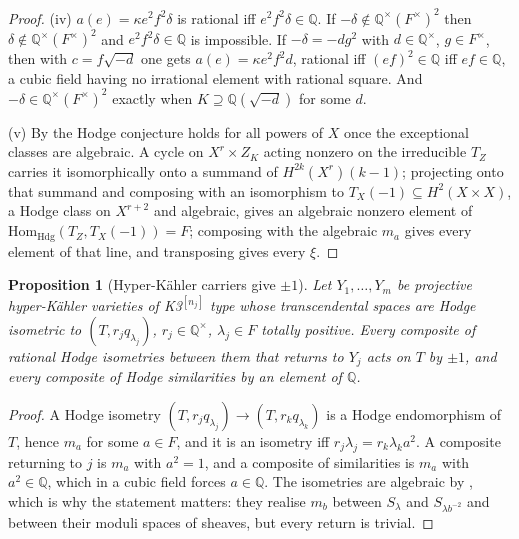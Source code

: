 \documentclass[11pt,reqno]{amsart}
\numberwithin{equation}{section}
\theoremstyle{plain}
\newtheorem{proposition}[theorem]{Proposition}
\theoremstyle{definition}
\newcommand{\QQ}{\mathbb{Q}}
\newcommand{\Hdg}{\mathrm{Hdg}}
\newcommand{\Hom}{\mathrm{Hom}}
\begin{document}
\begin{proof}
(iv) $a(e)=\kappa e^{2}f^{2}\delta$ is rational iff $e^{2}f^{2}\delta\in\QQ$. If $-\delta\notin\QQ^{\times}(F^{\times})^{2}$ then $\delta\notin\QQ^{\times}(F^{\times})^{2}$ and $e^{2}f^{2}\delta\in\QQ$ is impossible. If $-\delta=-dg^{2}$ with $d\in\QQ^{\times}$, $g\in F^{\times}$, then with $c=f\sqrt{-d}$ one gets $a(e)=\kappa e^{2}f^{2}d$, rational iff $(ef)^{2}\in\QQ$ iff $ef\in\QQ$, a cubic field having no irrational element with rational square. And $-\delta\in\QQ^{\times}(F^{\times})^{2}$ exactly when $K\supseteq\QQ(\sqrt{-d})$ for some $d$.

(v) By \cite[Thm.~21.7]{BMB26} the Hodge conjecture holds for all powers of $X$ once the exceptional classes are algebraic. A cycle on $X^{r}\times Z_{K}$ acting nonzero on the irreducible $T_{Z}$ carries it isomorphically onto a summand of $H^{2k}(X^{r})(k-1)$; projecting onto that summand and composing with an isomorphism to $T_{X}(-1)\subseteq H^{2}(X\times X)$, a Hodge class on $X^{r+2}$ and algebraic, gives an algebraic nonzero element of $\Hom_{\Hdg}(T_{Z},T_{X}(-1))=F$; composing with the algebraic $m_{a}$ gives every element of that line, and transposing gives every $\xi$.
\end{proof}

\begin{proposition}[Hyper-K\"ahler carriers give $\pm1$]\label{prop:hk}
Let $Y_{1},\dots,Y_{m}$ be projective hyper-K\"ahler varieties of K3$^{[n_{j}]}$ type whose transcendental spaces are Hodge isometric to $(T,r_{j}q_{\lambda_{j}})$, $r_{j}\in\QQ^{\times}$, $\lambda_{j}\in F$ totally positive. Every composite of rational Hodge isometries between them that returns to $Y_{j}$ acts on $T$ by $\pm1$, and every composite of Hodge similarities by an element of $\QQ$.
\end{proposition}

\begin{proof}
A Hodge isometry $(T,r_{j}q_{\lambda_{j}})\to(T,r_{k}q_{\lambda_{k}})$ is a Hodge endomorphism of $T$, hence $m_{a}$ for some $a\in F$, and it is an isometry iff $r_{j}\lambda_{j}=r_{k}\lambda_{k}a^{2}$. A composite returning to $j$ is $m_{a}$ with $a^{2}=1$, and a composite of similarities is $m_{a}$ with $a^{2}\in\QQ$, which in a cubic field forces $a\in\QQ$. The isometries are algebraic by \cite{Bus19,Mar24}, which is why the statement matters: they realise $m_{b}$ between $S_{\lambda}$ and $S_{\lambda b^{-2}}$ and between their moduli spaces of sheaves, but every return is trivial.
\end{proof}
\end{document}
